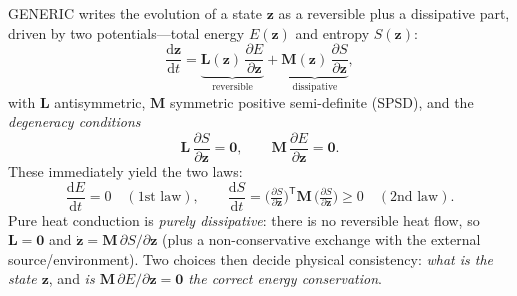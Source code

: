 \documentclass[11pt]{article}
\newcommand{\dd}{\mathrm{d}}
\newcommand{\T}{\mathsf{T}}                 %
\theoremstyle{definition}
\begin{document}
GENERIC writes the evolution of a state $\bm z$ as a reversible plus a dissipative
part, driven by two potentials---total energy $E(\bm z)$ and entropy $S(\bm z)$:
\begin{equation}
  \frac{\dd \bm z}{\dd t}
  = \underbrace{\bm L(\bm z)\,\frac{\partial E}{\partial\bm z}}_{\text{reversible}}
  + \underbrace{\bm M(\bm z)\,\frac{\partial S}{\partial\bm z}}_{\text{dissipative}},
  \label{eq:generic}
\end{equation}
with $\bm L$ antisymmetric, $\bm M$ symmetric positive semi-definite (SPSD), and the
\emph{degeneracy conditions}
\begin{equation}
  \bm L\,\frac{\partial S}{\partial\bm z}=\bm 0,
  \qquad
  \bm M\,\frac{\partial E}{\partial\bm z}=\bm 0.
  \label{eq:degeneracy}
\end{equation}
These immediately yield the two laws:
\begin{equation}
  \frac{\dd E}{\dd t}=0
  \quad(\text{1st law}),
  \qquad
  \frac{\dd S}{\dd t}
  =\Big(\tfrac{\partial S}{\partial\bm z}\Big)^{\!\T}\!\bm M\,
   \Big(\tfrac{\partial S}{\partial\bm z}\Big)\ge 0
  \quad(\text{2nd law}).
  \label{eq:laws}
\end{equation}
Pure heat conduction is \emph{purely dissipative}: there is no reversible heat flow, so
$\bm L=\bm 0$ and $\dot{\bm z}=\bm M\,\partial S/\partial\bm z$ (plus a non-conservative
exchange with the external source/environment). Two choices then decide physical
consistency: \emph{what is the state $\bm z$}, and \emph{is
$\bm M\,\partial E/\partial\bm z=\bm0$ the correct energy conservation}.
\end{document}

